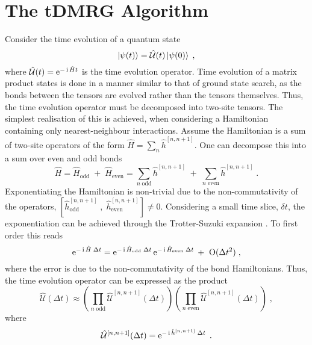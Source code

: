 \section{The tDMRG Algorithm}
Consider the time evolution of a quantum state
\begin{equation}
	\ket{\psi (t)} = \hat{\mathcal{U}}(t) \ket{\psi (0)} \; ,
\end{equation}
where $\hat{\mathcal{U}}(t) = \operatorname{e}^{ - \operatorname{i} \hat{H} t }$ is the time evolution operator. 
Time evolution of a matrix product states is done in a manner similar to that of ground state search, as the bonds between the tensors are evolved rather than the tensors themselves. Thus, the time evolution operator must be decomposed into two-site tensors. The simplest realisation of this is achieved, when considering a Hamiltonian containing only nearest-neighbour interactions.
Assume the Hamiltonian is a sum of two-site operators of the form $\hat{H} = \sum_{n} \hat{h}^{[n , n+1]}$. One can decompose this into a sum over even and odd bonds
\begin{equation}
	\hat{H} = \hat{H}_{\mathrm{odd}} \; + \; \hat{H}_{\mathrm{even}} = \sum_{n \; \mathrm{odd}} \hat{h}^{[n , n+1]} \; + \; \sum_{n \; \mathrm{even}} \hat{h}^{[n , n+1]} \; .
\end{equation}  
Exponentiating the Hamiltonian is non-trivial due to the non-commutativity of the operators, $[ \hat{h}_{\mathrm{odd}}^{[n , n+1]} \; , \; \hat{h}_{\mathrm{even}}^{[n , n+1]} ] \neq 0$. Considering a small time slice, $\delta t$, the exponentiation can be achieved through the Trotter-Suzuki expansion \cite{Suzuki}. To first order this reads
\begin{equation}
	\operatorname{e}^{- \operatorname{i} \hat{H} \; \Delta t} = \operatorname{e}^{- \operatorname{i} \hat{H}_{\mathrm{odd}} \; \Delta t } \operatorname{e}^{- \operatorname{i} \hat{H}_{\mathrm{even}} \; \Delta t} \; + \; \;  \mathrm{O}(\Delta t^2) \; ,
\end{equation}
where the error is due to the non-commutativity of the bond Hamiltonians. Thus, the time evolution operator can be expressed as the product
\begin{equation}
	\hat{\mathcal{U}}(\Delta t) \approx \left( \prod_{n \; \mathrm{odd}} \hat{\mathcal{U}}^{[n,n+1]} (\Delta t) \right) \left( \prod_{n \; \mathrm{even}} \hat{\mathcal{U}}^{[n,n+1]} (\Delta t) \right) \; ,
\end{equation}
where
\begin{equation}
	\hat{\mathcal{U}}^{[n,n+1]} (\Delta t) = \operatorname{e}^{- \operatorname{i} \hat{h}^{[n , n+1]} \; \Delta t } \; .
\end{equation}
